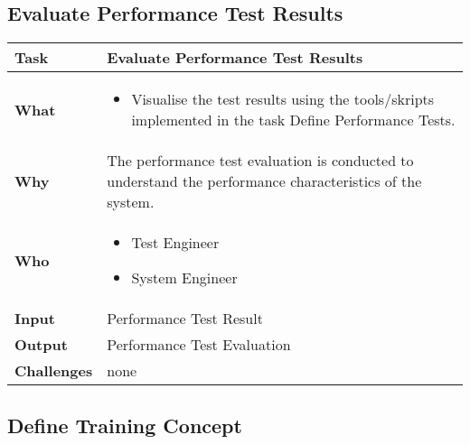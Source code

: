 \subsection{Evaluate Performance Test Results}

\begin{tabularx}{\textwidth}{@{} l X @{}}
	\caption{Evaluate Performance Test Results} \label{table:ch6_Evaluate_Performance_Results}\\
	\toprule 
	\bfseries Task & Evaluate Performance Test Results\\
	\midrule 
	\bfseries What & 
	\begin{itemize}
		\item Visualise the test results using the tools/skripts implemented in the task Define Performance Tests.
	\end{itemize}
	\\
	\midrule 
	\bfseries Why & The performance test evaluation is conducted to understand the performance characteristics of the system.\\
	\midrule 
	\bfseries Who & 
	\begin{itemize}
		\item Test Engineer
		\item System Engineer
	\end{itemize}
	\\
	\midrule 
	\bfseries Input & Performance Test Result\\
	\midrule 
	\bfseries Output & Performance Test Evaluation\\
	\midrule 
	\bfseries Challenges & none\\
	\bottomrule 
\end{tabularx}


\subsection{Define Training Concept}

